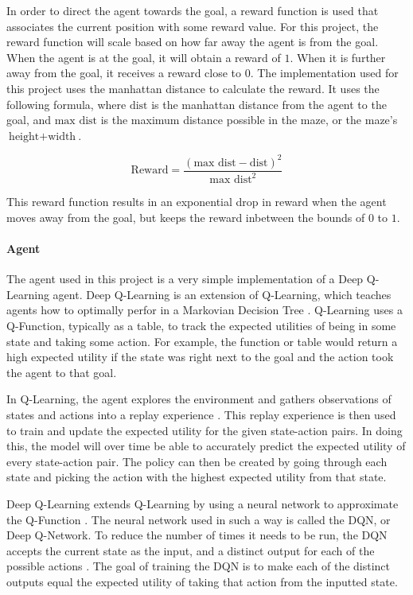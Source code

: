 \documentclass[12pt]{article}
\begin{document}
In order to direct the agent towards the goal, a reward function is used that associates the current position with some reward value.
For this project, the reward function will scale based on how far away the agent is from the goal.
When the agent is at the goal, it will obtain a reward of $1$. When it is further away from the goal, it receives a reward close to $0$.
The implementation used for this project uses the manhattan distance to calculate the reward.
It uses the following formula, where $\text{dist}$ is the manhattan distance from the agent to the goal, and $\text{max dist}$ is the maximum distance possible in the maze, or the maze's $\text{height} + \text{width}$.

$$\text{Reward} = \frac{(\text{max dist} - \text{dist}) ^ 2}{\text{max dist}^2}$$

This reward function results in an exponential drop in reward when the agent moves away from the goal, but keeps the reward inbetween the bounds of $0$ to $1$.


\paragraph{Agent}
The agent used in this project is a very simple implementation of a Deep Q-Learning agent.
Deep Q-Learning is an extension of Q-Learning, which teaches agents how to optimally perfor in a Markovian Decision Tree \cite{article_q_learning}.
Q-Learning uses a Q-Function, typically as a table, to track the expected utilities of being in some state and taking some action.
For example, the function or table would return a high expected utility if the state was right next to the goal and the action took the agent to that goal.

In Q-Learning, the agent explores the environment and gathers observations of states and actions into a replay experience \cite{article_reinforcement_learning_for_robots}.
This replay experience is then used to train and update the expected utility for the given state-action pairs.
In doing this, the model will over time be able to accurately predict the expected utility of every state-action pair.
The policy can then be created by going through each state and picking the action with the highest expected utility from that state.

Deep Q-Learning extends Q-Learning by using a neural network to approximate the Q-Function \cite{article_human_level_control_deep_reinforcement_learning}.
The neural network used in such a way is called the DQN, or Deep Q-Network.
To reduce the number of times it needs to be run, the DQN accepts the current state as the input, and a distinct output for each of the possible actions \cite{article_reinforcement_learning_survey}.
The goal of training the DQN is to make each of the distinct outputs equal the expected utility of taking that action from the inputted state.
\end{document}
